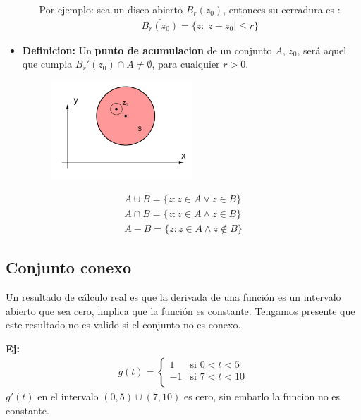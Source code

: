 \documentclass{article}
\newcommand{\caja}[3]{%
  \begin{tcolorbox}[colback=#1!5!white,colframe=#1!25!black,title=#2]
    #3
  \end{tcolorbox}%
}
\begin{document}
\begin{itemize}
\begin{itemize}
    Por ejemplo: sea un disco abierto $ B_r (z_0)  $, entonces su cerradura es : 
    \begin{gather*}
      \bar{B_r(z_0)} = \{z: \left|z-z_0 \right|\leq r \}
    \end{gather*}
  \end{itemize}
  \item \textbf{Definicion: } Un \textbf{punto de acumulacion } de un conjunto $ A  $, $ z_0  $, será aquel que cumpla $ B_r'(z_0) \cap A \neq \emptyset  $, para cualquier $ r>0  $.
    \begin{figure}[H]
      \begin{center}
        \includegraphics[width=0.5\textwidth]{punto_acumulacion.png}
      \end{center}
    \end{figure}
\end{itemize}

\caja{black}{}{
  \begin{gather*}
    A\cup B = \{z: z \in A \lor z \in B \}\\
    A\cap B = \{z: z\in A \land z\in B \}\\
    A-B = \{ z: z\in A \land z \notin B \}
  \end{gather*}
}

\subsection{Conjunto conexo }
Un resultado de cálculo real es que la derivada de una función es un intervalo abierto que sea cero, implica que la función es constante. Tengamos presente que este resultado no es valido si el conjunto no es conexo. 

\textbf{Ej: }
\begin{gather*}
  g(t) = 
     \begin{cases}
       1 &\text{si } 0 <t<5\\
       -1 &\text{si } 7 <t<10\\
     \end{cases} 
\end{gather*}
$ g'(t) $ en el intervalo $ (0,5)\cup (7,10) $ es cero, sin embarlo la funcion no es constante.
\end{document}

